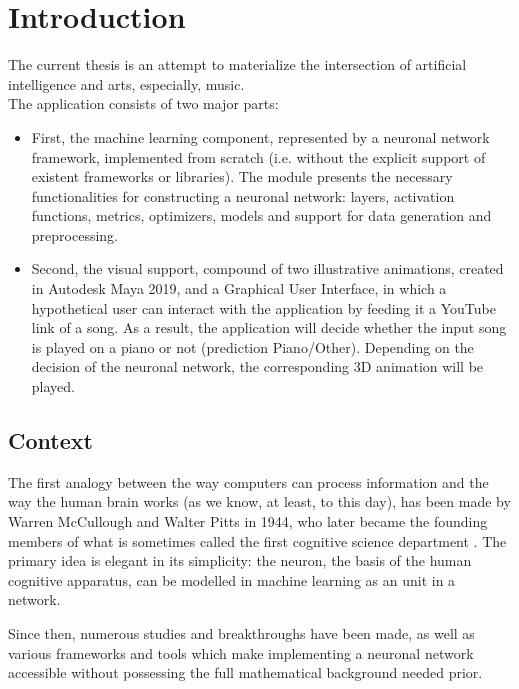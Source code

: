 \chapter*{Introduction}

The current thesis is an attempt to materialize the intersection of artificial intelligence and arts, especially, music. \\

The application consists of two major parts:\\
	\begin{itemize}
	\addtolength{\itemindent}{1cm}
		\item  First, the machine learning component, represented by a neuronal network framework, implemented from scratch (i.e. without the explicit support of existent frameworks or libraries). The module presents the necessary functionalities for constructing a neuronal network: layers, activation functions, metrics, optimizers, models and support for data generation and preprocessing.\\

		\item Second, the visual support, compound of two illustrative animations, created in Autodesk Maya 2019, and a Graphical User Interface, in which a hypothetical user can interact with the application by feeding it a YouTube link of a song. As a result, the application will decide whether the input song is played on a piano or not (prediction Piano/Other). Depending on the decision of the neuronal network, the corresponding 3D animation will be played.\\
	\end{itemize}

	\section{Context}

	The first analogy between the way computers can process information and the way the human brain works (as we know, at least, to this day), has been made by Warren McCullough and Walter Pitts in 1944, who later became the founding members of what is sometimes called the first cognitive science department \cite{mitnn}. The primary idea is elegant in its simplicity: the neuron, the basis of the human cognitive apparatus, can be modelled in machine learning as an unit in a network.

	Since then, numerous studies and breakthroughs have been made, as well as various frameworks and tools which make implementing a neuronal network accessible without possessing the full mathematical background needed prior.


